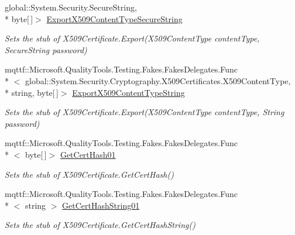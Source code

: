\begin{DoxyCompactItemize}
global\-::\-System.\-Security.\-Secure\-String, \\*
byte\mbox{[}$\,$\mbox{]}$>$ \hyperlink{class_system_1_1_security_1_1_cryptography_1_1_x509_certificates_1_1_fakes_1_1_stub_x509_certificate_ad051779e5b9eacc3920bf3e26e522274}{Export\-X509\-Content\-Type\-Secure\-String}
\begin{DoxyCompactList}\small\item\em Sets the stub of X509\-Certificate.\-Export(\-X509\-Content\-Type content\-Type, Secure\-String password)\end{DoxyCompactList}\item 
mqttf\-::\-Microsoft.\-Quality\-Tools.\-Testing.\-Fakes.\-Fakes\-Delegates.\-Func\\*
$<$ global\-::\-System.\-Security.\-Cryptography.\-X509\-Certificates.\-X509\-Content\-Type, \\*
string, byte\mbox{[}$\,$\mbox{]}$>$ \hyperlink{class_system_1_1_security_1_1_cryptography_1_1_x509_certificates_1_1_fakes_1_1_stub_x509_certificate_a6ec63eb05543a644dcfad346cf5be19a}{Export\-X509\-Content\-Type\-String}
\begin{DoxyCompactList}\small\item\em Sets the stub of X509\-Certificate.\-Export(\-X509\-Content\-Type content\-Type, String password)\end{DoxyCompactList}\item 
mqttf\-::\-Microsoft.\-Quality\-Tools.\-Testing.\-Fakes.\-Fakes\-Delegates.\-Func\\*
$<$ byte\mbox{[}$\,$\mbox{]}$>$ \hyperlink{class_system_1_1_security_1_1_cryptography_1_1_x509_certificates_1_1_fakes_1_1_stub_x509_certificate_a2f45348171ffa48317014236f1f42af8}{Get\-Cert\-Hash01}
\begin{DoxyCompactList}\small\item\em Sets the stub of X509\-Certificate.\-Get\-Cert\-Hash()\end{DoxyCompactList}\item 
mqttf\-::\-Microsoft.\-Quality\-Tools.\-Testing.\-Fakes.\-Fakes\-Delegates.\-Func\\*
$<$ string $>$ \hyperlink{class_system_1_1_security_1_1_cryptography_1_1_x509_certificates_1_1_fakes_1_1_stub_x509_certificate_a152fb7d1fe51628f800db6d3ff7d20b6}{Get\-Cert\-Hash\-String01}
\begin{DoxyCompactList}\small\item\em Sets the stub of X509\-Certificate.\-Get\-Cert\-Hash\-String()\end{DoxyCompactList}\item 

\end{DoxyCompactItemize}

